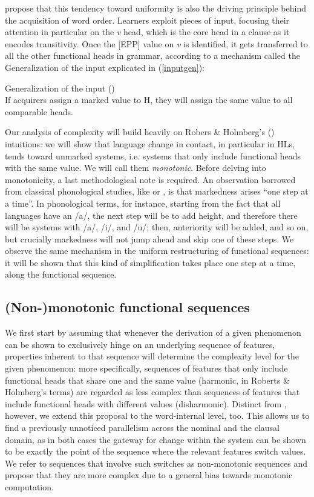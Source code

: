 \documentclass[output=paper]{langscibook}
\begin{document}
\citet[41]{RobertsHolmberg2010} propose that this tendency toward uniformity is also the driving principle behind the acquisition of word order. Learners exploit pieces of input, focusing their attention in particular on the \textit{v} head, which is the core head in a clause as it encodes transitivity. Once the [EPP] value on \textit{v} is identified, it gets transferred to all the other functional heads in grammar, according to a mechanism called the Generalization of the input explicated in (\ref{inputgen}):
\begin{exe}
\ex Generalization of the input (\citealt[41]{RobertsHolmberg2010})\\
If acquirers assign a marked value to H, they will assign the same value to all comparable heads. \label{inputgen}
\end{exe}
Our analysis of complexity will build heavily on Robers \& Holmberg's (\citeyear{RobertsHolmberg2010}) intuitions: we will show that language change in contact, in particular in HLs, tends toward unmarked systems, i.e. systems that only include functional heads with the same value. We will call them \textit{monotonic}. 
Before delving into monotonicity, a last methodological note is required. An observation borrowed from classical phonological studies, like \citet{ChomskyHalle1968} or \citet{Kean1975}, is that markedness arises ``one step at a time''. In phonological terms, for instance, starting from the fact that all languages have an /a/, the next step will be to add height, and therefore there will be systems with /a/, /i/, and /u/; then, anteriority will be added, and so on, but crucially markedness will not jump ahead and skip one of these steps. We observe the same mechanism in the uniform restructuring of functional sequences: it will be shown that this kind of simplification takes place one step at a time, along the functional sequence. 

\subsection{(Non-)monotonic functional sequences}

We first start by assuming that whenever the derivation of a given phenomenon can be shown to exclusively hinge on an underlying sequence of features, properties inherent to that sequence will determine the complexity level for the given phenomenon: more specifically, sequences of features that only include functional heads that share one and the same value (harmonic, in Roberts \& Holmberg's terms) are regarded as less complex than sequences of features that include functional heads with different values (disharmonic). Distinct from \citeauthor{RobertsHolmberg2010}, however, we extend this proposal to the word-internal level, too. This allows us to find a previously unnoticed parallelism across the nominal and the clausal domain, as in both cases the gateway for change within the system can be shown to be exactly the point of the sequence where the relevant features switch values. We refer to sequences that involve such switches as non-monotonic sequences and propose that they are more complex due to a general bias towards monotonic computation.
\end{document}
